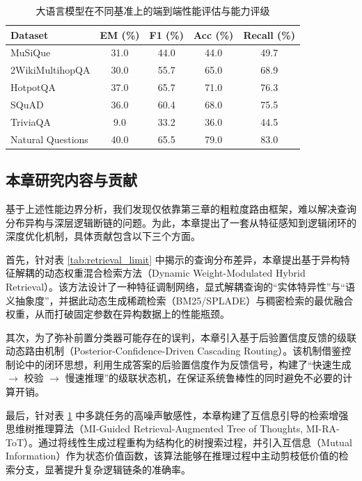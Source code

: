 \begin{table}[htbp]
    \centering
    \caption{大语言模型在不同基准上的端到端性能评估与能力评级}
    \label{tab:llm_limit}
    \renewcommand{\arraystretch}{1.2}
    \begin{tabular}{l c c c c}
        \toprule
        \textbf{Dataset} & \textbf{EM (\%)} & \textbf{F1 (\%)} & \textbf{Acc (\%)} & \textbf{Recall (\%)} \\
        \midrule
        MuSiQue         & 31.0 & 44.0 & 44.0 & 49.7 \\
        2WikiMultihopQA & 30.0 & 55.7 & 65.0 & 68.9 \\
        HotpotQA        & 37.0 & 65.7 & 71.0 & 76.3 \\
        SQuAD           & 36.0 & 60.4 & 68.0 & 75.5 \\
        TriviaQA        & 9.0  & 33.2 & 36.0 & 44.5 \\
        Natural Questions & 40.0 & 65.5 & 79.0 & 83.0 \\
        \bottomrule
    \end{tabular}
\end{table}

\subsection{本章研究内容与贡献}\label{sec:chap04_contributions}

基于上述性能边界分析，我们发现仅依靠第三章的粗粒度路由框架，难以解决查询分布异构与深层逻辑断链的问题。为此，本章提出了一套从特征感知到逻辑闭环的深度优化机制，具体贡献包含以下三个方面。

首先，针对表 \ref{tab:retrieval_limit} 中揭示的查询分布差异，本章提出基于异构特征解耦的动态权重混合检索方法（Dynamic Weight-Modulated Hybrid Retrieval）。该方法设计了一种特征调制网络，显式解耦查询的“实体特异性”与“语义抽象度”，并据此动态生成稀疏检索（BM25/SPLADE）与稠密检索的最优融合权重，从而打破固定参数在异构数据上的性能瓶颈。

其次，为了弥补前置分类器可能存在的误判，本章引入基于后验置信度反馈的级联动态路由机制（Posterior-Confidence-Driven Cascading Routing）。该机制借鉴控制论中的闭环思想，利用生成答案的后验置信度作为反馈信号，构建了“快速生成 $\rightarrow$ 校验 $\rightarrow$ 慢速推理”的级联状态机，在保证系统鲁棒性的同时避免不必要的计算开销。

最后，针对表 \ref{tab:llm_limit} 中多跳任务的高噪声敏感性，本章构建了互信息引导的检索增强思维树推理算法（MI-Guided Retrieval-Augmented Tree of Thoughts, MI-RA-ToT）。通过将线性生成过程重构为结构化的树搜索过程，并引入互信息（Mutual Information）作为状态价值函数，该算法能够在推理过程中主动剪枝低价值的检索分支，显著提升复杂逻辑链条的准确率。

